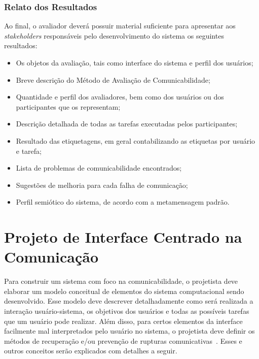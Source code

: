 \subsubsection{Relato dos Resultados}

\indent Ao final, o avaliador deverá possuir material suficiente para apresentar aos \textit{stakeholders} responsáveis pelo desenvolvimento do sistema os seguintes resultados:

\begin{itemize}
\item Os objetos da avaliação, tais como interface do sistema e perfil dos usuários;
\item Breve descrição do Método de Avaliação de Comunicabilidade;
\item Quantidade e perfil dos avaliadores, bem como dos usuários ou dos participantes que os representam;
\item Descrição detalhada de todas as tarefas executadas pelos participantes;
\item Resultado das etiquetagens, em geral contabilizando as etiquetas por usuário e tarefa;
\item Lista de problemas de comunicabilidade encontrados;
\item Sugestões de melhoria para cada falha de comunicação;
\item Perfil semiótico do sistema, de acordo com a metamensagem padrão.
\end{itemize}










\section{Projeto de Interface Centrado na Comunicação} \label{projetoDeInterface}

\indent Para construir um sistema com foco na comunicabilidade, o projetista deve elaborar um modelo conceitual de elementos do sistema computacional sendo desenvolvido. Esse modelo deve descrever detalhadamente como será realizada a interação usuário-sistema, os objetivos dos usuários e todas as possíveis tarefas que um usuário pode realizar. Além disso, para certos elementos da interface facilmente mal interpretados pelo usuário no sistema, o projetista deve definir os métodos de recuperação e/ou prevenção de rupturas comunicativas~\cite{IHCbook}. Esses e outros conceitos serão explicados com detalhes a seguir.

